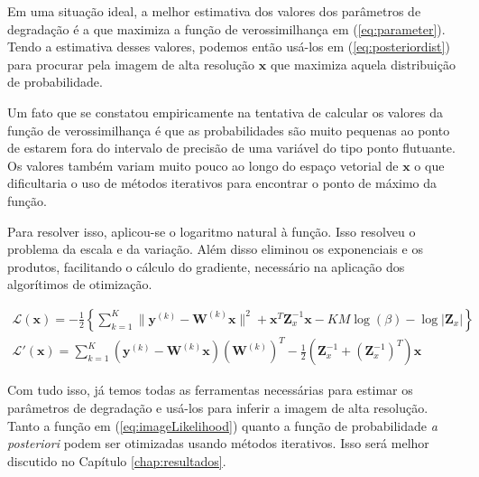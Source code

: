 Em uma situação ideal, a melhor estimativa dos valores dos parâmetros de degradação é a que maximiza a função de verossimilhança em (\ref{eq:parameter}).
Tendo a estimativa desses valores, podemos então usá-los em (\ref{eq:posteriordist}) para procurar pela imagem de alta resolução $\mathbf{x}$ que maximiza aquela distribuição de probabilidade.

Um fato que se constatou empiricamente na tentativa de calcular os valores da função de verossimilhança é que as probabilidades são muito pequenas ao ponto de estarem fora do intervalo de precisão de uma variável do tipo ponto flutuante.
Os valores também variam muito pouco ao longo do espaço vetorial de $\mathbf{x}$ o que dificultaria o uso de métodos iterativos para encontrar o ponto de máximo da função.


Para resolver isso, aplicou-se o logaritmo natural à função. Isso resolveu o problema da escala e da variação.
Além disso eliminou os exponenciais e os produtos, facilitando o cálculo do gradiente, necessário na aplicação dos algorítimos de otimização.

\begin{gather}
	\label{eq:imageLikelihood} \mathcal{L}(\mathbf{x}) = -\frac{1}{2} \left\{ \sum^K_{k=1} \|\mathbf{y}^{(k)} - \mathbf{W}^{(k)} \mathbf{x} \|^2 + \mathbf{x}^T\mathbf{Z}^{-1}_x\mathbf{x} - KM\log{(\beta)} - \log{|\mathbf{Z}_x|} \right\} \\ 
	\label{eq:imageLikelihood_gradient} \mathcal{L}'(\mathbf{x}) =  \sum^K_{k=1}  (\mathbf{y}^{(k)} - \mathbf{W}^{(k)}\mathbf{x})(\mathbf{W}^{(k)})^T  - \frac{1}{2}(\mathbf{Z}^{-1}_x + (\mathbf{Z}^{-1}_x)^T)\mathbf{x}  
\end{gather}

Com tudo isso, já temos todas as ferramentas necessárias para estimar os parâmetros de degradação e usá-los para inferir a imagem de alta resolução.
Tanto a função em (\ref{eq:imageLikelihood}) quanto a função de probabilidade \emph{a posteriori} podem ser otimizadas usando métodos iterativos.
Isso será melhor discutido no Capítulo \ref{chap:resultados}.
